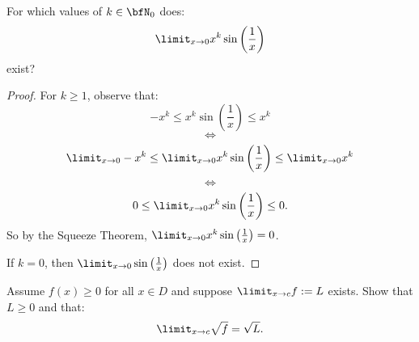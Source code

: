 \documentclass[11pt,twoside,openany]{memoir}
\begin{document}
    \begin{exercise}
        For which values of $k \in \bfN_0$ does:
            \begin{equation*}
            \begin{split}
                \limit_{x \rightarrow 0}x^k \sin \left(\frac{1}{x}\right)
            \end{split}
            \end{equation*}
        exist?
    \end{exercise}
        \begin{proof}
            For $k \geq 1$, observe that:
                \begin{equation*}
                    -x^k \leq x^k \sin \left(\frac{1}{x}\right) \leq x^k
                \end{equation*}
                \begin{equation*}
                    \iff
                \end{equation*}
                \begin{equation*}
                    \limit_{x \rightarrow 0}-x^k \leq \limit_{x \rightarrow 0}x^k \sin \left(\frac{1}{x}\right) \leq \limit_{x \rightarrow 0}x^k
                \end{equation*}
                \begin{equation*}
                    \iff
                \end{equation*}
                \begin{equation*}
                    0 \leq \limit_{x \rightarrow 0}x^k \sin \left(\frac{1}{x}\right) \leq 0.
                \end{equation*}
            So by the Squeeze Theorem, $\limit_{x \rightarrow 0}x^k \sin \left(\frac{1}{x}\right) = 0$. \nl
            
            If $k=0$, then $\limit_{x \rightarrow 0}\sin \left(\frac{1}{x}\right)$ does not exist.
        \end{proof}
    \begin{exercise}
        Assume $f(x) \geq 0$ for all $x \in D$ and suppose $\limit_{x \rightarrow c}f := L$ exists. Show that $L \geq 0$ and that:
            \begin{equation*}
            \begin{split}
                \limit_{x \rightarrow c}\sqrt{f} = \sqrt{L}.
            \end{split}
            \end{equation*}
    \end{exercise}
\end{document}
